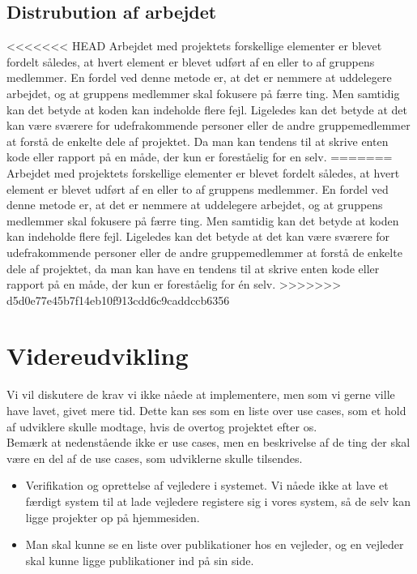 \documentclass[12pt]{article}
\begin{document}
\subsection{Distrubution af arbejdet}
<<<<<<< HEAD
Arbejdet med projektets forskellige elementer er blevet fordelt således, at hvert element er blevet udført af en eller to af gruppens medlemmer. En fordel ved denne metode er, at det er nemmere at uddelegere arbejdet, og at gruppens medlemmer skal fokusere på færre ting. Men samtidig kan det betyde at koden kan indeholde flere fejl. Ligeledes kan det betyde at det kan være sværere for udefrakommende personer eller de andre gruppemedlemmer at forstå de enkelte dele af projektet. Da man kan tendens til at skrive enten kode eller rapport på en måde, der kun er foreståelig for en selv.
=======
Arbejdet med projektets forskellige elementer er blevet fordelt således, at hvert element er blevet udført af en eller to af gruppens medlemmer. En fordel ved denne metode er, at det er nemmere at uddelegere arbejdet, og at gruppens medlemmer skal fokusere på færre ting. Men samtidig kan det betyde at koden kan indeholde flere fejl. Ligeledes kan det betyde at det kan være sværere for udefrakommende personer eller de andre gruppemedlemmer at forstå de enkelte dele af projektet, da man kan have en tendens til at skrive enten kode eller rapport på en måde, der kun er foreståelig for én selv.
>>>>>>> d5d0e77e45b7f14eb10f913cdd6c9caddccb6356

\section{Videreudvikling}
\label{sec:videreudvikling}
Vi vil diskutere de krav vi ikke nåede at implementere, men som vi gerne ville have lavet, givet mere tid. Dette kan ses som en liste over use cases, som et hold af udviklere skulle modtage, hvis de overtog projektet efter os.\\
Bemærk at nedenstående ikke er use cases, men en beskrivelse af de ting der skal være en del af de use cases, som udviklerne skulle tilsendes.\\
\begin{itemize}
\item Verifikation og oprettelse af vejledere i systemet. Vi nåede ikke at lave et færdigt system til at lade vejledere registere sig i vores system, så de selv kan ligge projekter op på hjemmesiden.
\item Man skal kunne se en liste over publikationer hos en vejleder, og en vejleder skal kunne ligge publikationer ind på sin side.
\end{itemize}
\end{document}
